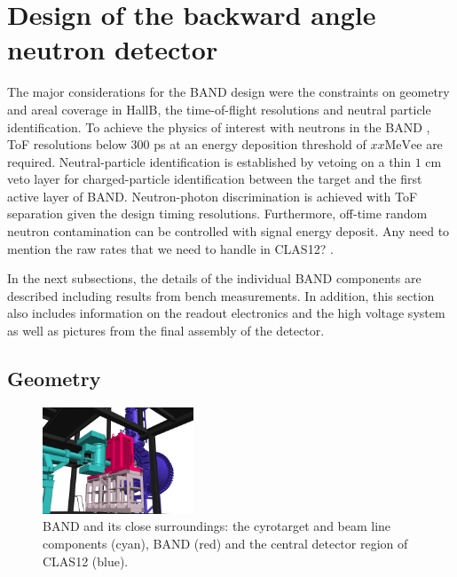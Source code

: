 \documentclass[3p,final,twocolumn]{elsarticle}
\begin{document}

\section{Design of the backward angle neutron detector}
The major considerations for the BAND design were the constraints on geometry and areal coverage in HallB, the time-of-flight resolutions and neutral particle identification.
To achieve the physics of interest with neutrons in the BAND \cite{band-proposal}, ToF resolutions below $300$ \si{\pico\second} at an energy deposition threshold of $xx \mathrm{MeVee}$ are required. Neutral-particle identification is established by vetoing on a thin $1$ \si{\centi\meter} veto layer for charged-particle identification between the target and the first active layer of BAND. Neutron-photon discrimination is achieved with ToF separation given the design 
timing resolutions. Furthermore, off-time random neutron contamination can be controlled with signal energy deposit. {\color{red} Any need to mention 
the raw rates that we need to handle in CLAS12?} .

In the next subsections, the details of the individual BAND components are described including results from bench measurements. In addition, this section also includes information on the readout electronics and the high voltage system as well as pictures from the final assembly of the detector.


\subsection{Geometry}
\begin{figure}[tb]
	\centering
		\includegraphics[width=0.40\textwidth]{FULL_CONTEXT_STUDIE_3.png}
		\vspace{0.5cm}
		\caption{BAND and its close surroundings: the cyrotarget and beam line components (cyan),  BAND (red) and the central detector region of CLAS12 (blue). }
		\label{fig:bandtarget}
		
\end{figure}
\end{document}
